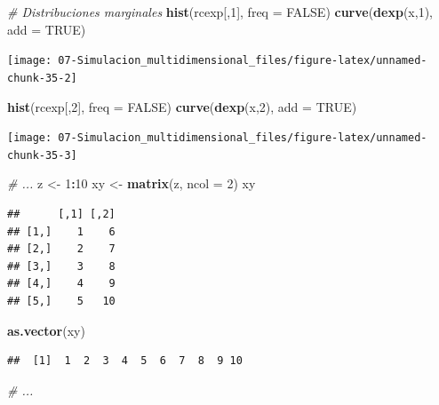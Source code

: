\documentclass[]{book}
\newenvironment{Shaded}{\begin{snugshade}}{\end{snugshade}}
\newcommand{\KeywordTok}[1]{\textcolor[rgb]{0.13,0.29,0.53}{\textbf{#1}}}
\newcommand{\DataTypeTok}[1]{\textcolor[rgb]{0.13,0.29,0.53}{#1}}
\newcommand{\DecValTok}[1]{\textcolor[rgb]{0.00,0.00,0.81}{#1}}
\newcommand{\StringTok}[1]{\textcolor[rgb]{0.31,0.60,0.02}{#1}}
\newcommand{\CommentTok}[1]{\textcolor[rgb]{0.56,0.35,0.01}{\textit{#1}}}
\newcommand{\OtherTok}[1]{\textcolor[rgb]{0.56,0.35,0.01}{#1}}
\newcommand{\OperatorTok}[1]{\textcolor[rgb]{0.81,0.36,0.00}{\textbf{#1}}}
\newcommand{\NormalTok}[1]{#1}
\theoremstyle{definition}
\theoremstyle{definition}
\theoremstyle{definition}
\theoremstyle{remark}
\begin{document}
\begin{enumerate}
\begin{Shaded}
\begin{Highlighting}[]
\CommentTok{# Distribuciones marginales}
\KeywordTok{hist}\NormalTok{(rcexp[,}\DecValTok{1}\NormalTok{], }\DataTypeTok{freq =} \OtherTok{FALSE}\NormalTok{)}
\KeywordTok{curve}\NormalTok{(}\KeywordTok{dexp}\NormalTok{(x,}\DecValTok{1}\NormalTok{), }\DataTypeTok{add =} \OtherTok{TRUE}\NormalTok{)}
\end{Highlighting}
\end{Shaded}

  \begin{center}\texttt{[image: 07-Simulacion\_multidimensional\_files/figure-latex/unnamed-chunk-35-2]} \end{center}

\begin{Shaded}
\begin{Highlighting}[]
\KeywordTok{hist}\NormalTok{(rcexp[,}\DecValTok{2}\NormalTok{], }\DataTypeTok{freq =} \OtherTok{FALSE}\NormalTok{)}
\KeywordTok{curve}\NormalTok{(}\KeywordTok{dexp}\NormalTok{(x,}\DecValTok{2}\NormalTok{), }\DataTypeTok{add =} \OtherTok{TRUE}\NormalTok{)}
\end{Highlighting}
\end{Shaded}

  \begin{center}\texttt{[image: 07-Simulacion\_multidimensional\_files/figure-latex/unnamed-chunk-35-3]} \end{center}

\begin{Shaded}
\begin{Highlighting}[]
\CommentTok{# ...}
\NormalTok{z <-}\StringTok{ }\DecValTok{1}\OperatorTok{:}\DecValTok{10}
\NormalTok{xy <-}\StringTok{ }\KeywordTok{matrix}\NormalTok{(z, }\DataTypeTok{ncol =} \DecValTok{2}\NormalTok{)}
\NormalTok{xy}
\end{Highlighting}
\end{Shaded}

\begin{verbatim}
##      [,1] [,2]
## [1,]    1    6
## [2,]    2    7
## [3,]    3    8
## [4,]    4    9
## [5,]    5   10
\end{verbatim}

\begin{Shaded}
\begin{Highlighting}[]
\KeywordTok{as.vector}\NormalTok{(xy)}
\end{Highlighting}
\end{Shaded}

\begin{verbatim}
##  [1]  1  2  3  4  5  6  7  8  9 10
\end{verbatim}

\begin{Shaded}
\begin{Highlighting}[]
\CommentTok{# ...}
\end{Highlighting}
\end{Shaded}
\end{enumerate}
\end{document}
